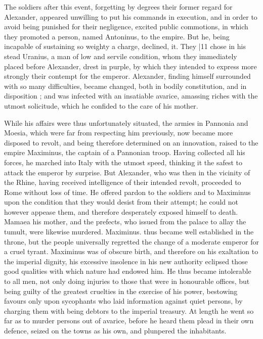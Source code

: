 The soldiers after this event, forgetting by degrees their former regard for Alexander, appeared unwilling to put his commands in execution, and in order to avoid being punished for their negligence, excited public commotions, in which they promoted a person, named Antoninus, to the empire. But he, being incapable of sustaining so weighty a
charge, declined, it. They |11 chose in his stead Uranius, a man of low and servile condition, whom they immediately placed before Alexander, drest in purple, by which they intended to express more strongly their contempt for the emperor. Alexander, finding himself surrounded with so many difficulties, became changed, both in bodily constitution, and in disposition ; and was infected with an insatiable avarice, amassing riches with the utmost solicitude, which he confided to the care of his mother.

While his affairs were thus unfortunately situated, the armies in Pannonia and Moesia, which were far from respecting him previously, now became more disposed to revolt, and being therefore determined on an innovation, raised to the empire Maximinus, the captain of a Pannonian troop. Having collected all his forces, he marched into Italy with the utmost speed, thinking it the safest to attack the emperor by surprise. But Alexander, who was then in the vicinity of the Rhine, having received intelligence of their intended revolt, proceeded to Rome without loss of time. He offered pardon to the soldiers and to Maximinus upon the condition that they would desist from their attempt; he could not however appease them, and therefore desperately exposed himself to death. Mamaea his mother, and the prefects, who issued from the palace to allay the tumult, were likewise murdered. Maximinus. thus became well established in the throne, but the people universally regretted the change of a moderate emperor for a cruel tyrant. Maximinus was of obscure birth, and therefore on his exaltation to the imperial dignity, his excessive insolence in his new authority eclipsed those good qualities with which nature had endowed him. He thus became intolerable to all men, not only doing injuries to those that were in honourable offices, but being guilty of the greatest cruelties in the exercise of his power, bestowing favours only upon sycophants who laid information against quiet persons, by charging them with being debtors to the imperial treasury. At length he went so far as to murder persons out of avarice, before he heard them plead in their own defence, seized on the towns as his own, and plunpered the inhabitants.

